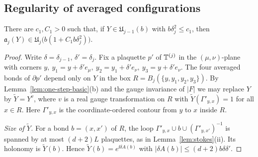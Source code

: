 \subsection{Regularity of averaged configurations}

\begin{lemma}\label{lem:one-step-regularity}
There are $c_1,C_1>0$ such that, if $Y\in\mathfrak U_{j-1}(b)$ with $b\delta_j^2\le c_1$, then $\mathfrak a_j(Y)\in\mathfrak U_j\big(b(1+C_1b\delta_j^2)\big)$.
\end{lemma}

\begin{proof}
Write $\delta=\delta_{j-1}$, $\delta'=\delta_j$. Fix a plaquette $p'$ of $\mathbb T^{(j)}$ in the $(\mu,\nu)$-plane with corners $y,\ y_1=y+\delta'e_\mu,\ y_2=y_1+\delta'e_\nu,\ y_3=y+\delta'e_\nu$. The four averaged bonds of $\partial p'$ depend only on $Y$ in the box $R=B_j(\{y,y_1,y_2,y_3\})$. By Lemma~\ref{lem:one-step-basic}(b) and the gauge invariance of $|F|$ we may replace $Y$ by $\tilde Y=Y^v$, where $v$ is a real gauge transformation on $R$ with $\tilde Y(\Gamma'_{y,x})=1$ for all $x\in R$. Here $\Gamma'_{y,x}$ is the coordinate-ordered contour from $y$ to $x$ inside $R$.

\emph{Size of $\tilde Y$.} For a bond $b=(x,x')$ of $R$, the loop $\Gamma'_{y,x}\cup b\cup(\Gamma'_{y,x'})^{-1}$ is spanned by at most $(d+2)L$ plaquettes, as in Lemma~\ref{lem:stokes}(ii). Its holonomy is $\tilde Y(b)$. Hence $\tilde Y(b)=e^{\ii\delta A(b)}$ with $|\delta A(b)|\le(d+2)b\delta\delta'$.


\end{proof}
